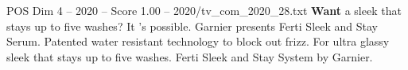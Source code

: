 \begin{textsample}{POS Dim 4 – 2020 – Score 1.00 – 2020/tv\_com\_2020\_28.txt}  \label{ex:f4_pos_047}
\textbf{Want} a sleek that stays up to five washes?
It 's possible.
Garnier presents Ferti Sleek and Stay Serum.
Patented water resistant technology to block out frizz.
For ultra glassy sleek that stays up to five washes.
Ferti Sleek and Stay System by Garnier.

\end{textsample}
